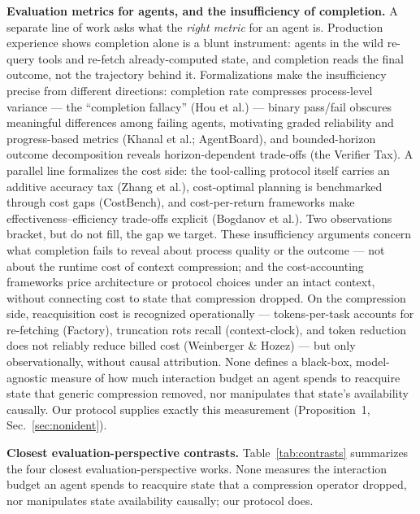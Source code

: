 \documentclass[11pt]{article}
\begin{document}
\textbf{Evaluation metrics for agents, and the insufficiency of completion.} A separate line of
work asks what the \emph{right metric} for an agent is. Production experience shows completion
alone is a blunt instrument: agents in the wild re-query tools and re-fetch
already-computed state, and completion reads the final outcome, not the trajectory behind
it. Formalizations make the insufficiency precise from different directions: completion
rate compresses process-level variance --- the ``completion fallacy'' (Hou et al.) --- binary
pass/fail obscures meaningful differences among failing agents, motivating graded
reliability and progress-based metrics (Khanal et al.; AgentBoard), and bounded-horizon
outcome decomposition reveals horizon-dependent trade-offs (the Verifier Tax). A parallel
line formalizes the cost side: the tool-calling protocol itself carries an additive
accuracy tax (Zhang et al.), cost-optimal planning is benchmarked through cost gaps
(CostBench), and cost-per-return frameworks make effectiveness--efficiency trade-offs
explicit (Bogdanov et al.). Two observations bracket, but do not fill, the gap we target.
These insufficiency arguments concern what completion fails to reveal about process quality
or the outcome --- not about the runtime cost of context compression; and the cost-accounting
frameworks price architecture or protocol choices under an intact context, without
connecting cost to state that compression dropped. On the compression side, reacquisition
cost is recognized operationally --- tokens-per-task accounts for re-fetching (Factory),
truncation rots recall (context-clock), and token reduction does not reliably reduce billed
cost (Weinberger \& Hozez) --- but only observationally, without causal attribution. None
defines a black-box, model-agnostic measure of how much interaction budget an agent spends
to reacquire state that generic compression removed, nor manipulates that state's
availability causally. Our protocol supplies exactly this measurement (Proposition~1,
Sec.~\ref{sec:nonident}).

\textbf{Closest evaluation-perspective contrasts.} Table~\ref{tab:contrasts} summarizes the four closest
evaluation-perspective works. None measures the interaction budget an agent spends to
reacquire state that a compression operator dropped, nor manipulates state availability
causally; our protocol does.
\end{document}
